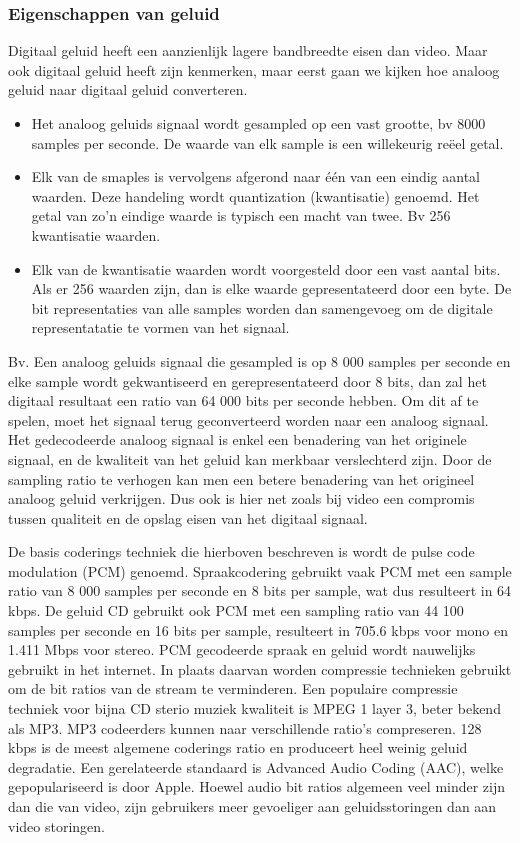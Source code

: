 \subsubsection{Eigenschappen van geluid}

\noindent Digitaal geluid heeft een aanzienlijk lagere bandbreedte eisen dan video. Maar ook digitaal geluid heeft zijn kenmerken, maar eerst gaan we kijken hoe analoog geluid naar digitaal geluid converteren.

\begin{itemize}
\item Het analoog geluids signaal wordt gesampled op een vast grootte, bv 8000 samples per seconde. De waarde van elk sample is een willekeurig reëel getal.
\item Elk van de smaples is vervolgens afgerond naar één van een eindig aantal waarden. Deze handeling wordt quantization (kwantisatie) genoemd. Het getal van zo’n eindige waarde is typisch een macht van twee. Bv 256 kwantisatie waarden.
\item Elk van de kwantisatie waarden wordt voorgesteld door een vast aantal bits. Als er 256 waarden zijn, dan is elke waarde gepresentateerd door een byte. De bit representaties van alle samples worden dan samengevoeg om de digitale representatatie te vormen van het signaal.
\end{itemize}

\noindent Bv. Een analoog geluids signaal die gesampled is op 8 000 samples per seconde en elke sample wordt gekwantiseerd  en gerepresentateerd door 8 bits, dan zal het digitaal resultaat een ratio van 64 000 bits per seconde hebben.
Om dit af te spelen, moet het signaal terug geconverteerd worden naar een analoog signaal. Het gedecodeerde analoog signaal is enkel een benadering van het originele signaal, en de kwaliteit van het geluid kan merkbaar verslechterd zijn. Door de sampling ratio te verhogen kan men een betere benadering van het origineel analoog geluid verkrijgen.
Dus ook is hier net zoals bij video een compromis tussen qualiteit en de opslag eisen van het digitaal signaal.

\noindent De basis coderings techniek die hierboven beschreven is wordt de pulse code modulation (PCM) genoemd. Spraakcodering gebruikt vaak PCM met een sample ratio van 8 000 samples per seconde en 8 bits per sample, wat dus resulteert in 64 kbps. De geluid CD gebruikt ook PCM met een sampling ratio van 44 100 samples per seconde en 16 bits per sample, resulteert in 705.6 kbps voor mono en 1.411 Mbps voor stereo.
PCM gecodeerde spraak en geluid wordt nauwelijks gebruikt in het internet. In plaats daarvan worden compressie technieken gebruikt om de bit ratios van de stream te verminderen. Een populaire compressie techniek voor bijna CD sterio muziek kwaliteit is MPEG 1 layer 3, beter bekend als MP3. MP3 codeerders kunnen naar verschillende ratio’s compreseren. 128 kbps is de meest algemene coderings ratio en produceert heel weinig geluid degradatie. Een gerelateerde standaard is Advanced Audio Coding (AAC), welke gepopulariseerd is door Apple. Hoewel audio bit ratios algemeen veel minder zijn dan die van video, zijn gebruikers meer gevoeliger aan geluidsstoringen dan aan video storingen.

